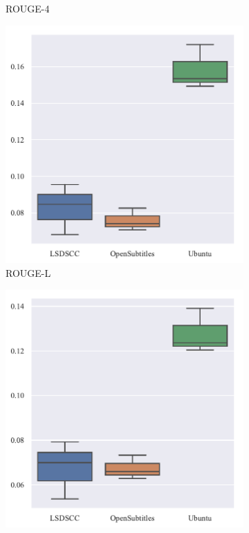 \begin{figure}[H]
\begin{subfigure}{0.25\linewidth}
        \caption{ROUGE-4}
    \end{subfigure}
    \begin{subfigure}{0.25\linewidth}
        \centering
        \includegraphics[width=\linewidth]{figure/boxplot/dataset/rouge_l/plot.pdf}
        \caption{ROUGE-L}
    \end{subfigure}%
    \begin{subfigure}{0.25\linewidth}
        \centering
        \includegraphics[width=\linewidth]{figure/boxplot/dataset/rouge_w/plot.pdf}

\end{subfigure}
\end{figure}

